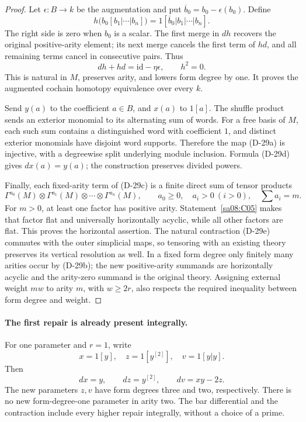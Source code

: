 \begin{proof}
Let \(\epsilon:B\to k\) be the augmentation and put
\(\overline b_0=b_0-\epsilon(b_0)\). Define
\[
 h\bigl(b_0[b_1|\cdots|b_n]\bigr)
       =1[\overline b_0|b_1|\cdots|b_n].
 \tag{D-29e}
\]
The right side is zero when \(b_0\) is a scalar.
The first merge in \(dh\) recovers the original
positive-arity element; its next merge cancels the
first term of \(hd\), and all remaining terms cancel
in consecutive pairs. Thus
\[
                 dh+hd=\mathrm{id}-\eta\epsilon,
                 \qquad h^2=0.
 \tag{D-29f}
\]
This is natural in \(M\), preserves arity, and lowers
form degree by one. It proves the augmented cochain
homotopy equivalence over every \(k\).

Send \(y(a)\) to the coefficient \(a\in B\), and
\(x(a)\) to \(1[a]\). The shuffle product sends an
exterior monomial to its alternating sum of words.
For a free basis of \(M\), each such sum contains a
distinguished word with coefficient \(1\), and distinct
exterior monomials have disjoint word supports. Therefore
the map (D-29a) is injective, with a degreewise split
underlying module inclusion. Formula (D-29d) gives
\(dx(a)=y(a)\); the construction preserves divided powers.

Finally, each fixed-arity term of (D-29c) is a finite
direct sum of tensor products
\[
 \Gamma^{a_0}(M)\otimes\Gamma^{a_1}(M)\otimes\cdots
       \otimes\Gamma^{a_n}(M),
 \qquad a_0\ge0,\quad a_i>0\ (i>0),\quad\sum a_i=m.
\]
For \(m>0\), at least one factor has positive arity.
Statement~\ref{sa08:C05} makes that factor flat and
universally horizontally acyclic, while all other
factors are flat. This proves the horizontal assertion.
The natural contraction (D-29e) commutes with the
outer simplicial maps, so tensoring with an existing
theory preserves its vertical resolution as well.
In a fixed form degree only finitely many arities occur
by (D-29b); the new positive-arity summands are
horizontally acyclic and the arity-zero summand is
the original theory. Assigning external weight \(mw\)
to arity \(m\), with \(w\ge2r\), also respects the
required inequality between form degree and weight.
\end{proof}

\paragraph{The first repair is already present integrally.}
For one parameter and \(r=1\), write
\[
 x=1[y],\quad z=1[y^{[2]}],\quad v=1[y|y].
\]
Then
\[
 dx=y,\qquad dz=y^{[2]},\qquad dv=xy-2z.
 \tag{D-29g}
\]
The new parameters \(z,v\) have form degrees three
and two, respectively. There is no new form-degree-one
parameter in arity two. The bar differential and the
contraction include every higher repair integrally,
without a choice of a prime.

